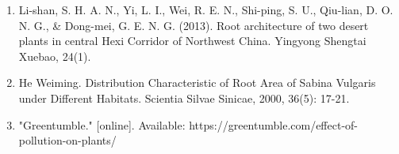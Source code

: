 \documentclass[11pt,a4paper]{ctexart}
\begin{document}
\begin{enumerate}
\item[{[13]}] Li-shan, S. H. A. N., Yi, L. I., Wei, R. E. N., Shi-ping, S. U., Qiu-lian, D. O. N. G., \& Dong-mei, G. E. N. G. (2013). Root architecture of two desert plants in central Hexi Corridor of Northwest China. Yingyong Shengtai Xuebao, 24(1).
\item[{[14]}] He Weiming. Distribution Characteristic of Root Area of Sabina Vulgaris under Different Habitats. Scientia Silvae Sinicae, 2000, 36(5): 17-21.
\item[{[15]}] "Greentumble." [online]. Available: https://greentumble.com/effect-of-pollution-on-plants/
\end{enumerate}
\end{document}
